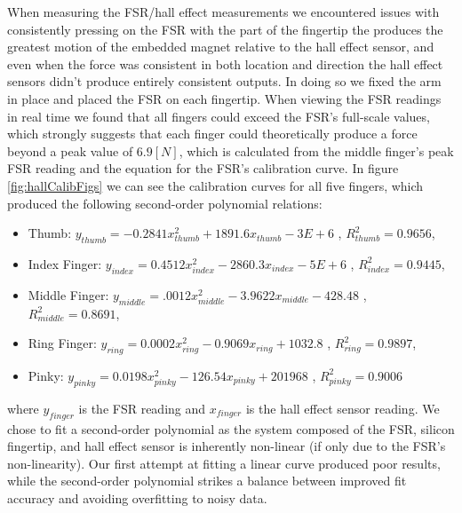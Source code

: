 \documentclass[10pt]{article}
\begin{document}
When measuring the FSR/hall effect measurements we encountered issues with consistently pressing on the FSR with the part of the fingertip the produces the greatest motion of the embedded magnet relative to the hall effect sensor, and even when the force was consistent in both location and direction the hall effect sensors didn't produce entirely consistent outputs. In doing so we fixed the arm in place and placed the FSR on each fingertip. When viewing the FSR readings in real time we found that all fingers could exceed the FSR's full-scale values, which strongly suggests that each finger could theoretically produce a force beyond a peak value of $6.9[N]$, which is calculated from the middle finger's peak FSR reading and the equation for the FSR's calibration curve. In figure \ref{fig:hallCalibFigs} we can see the calibration curves for all five fingers, which produced the following second-order polynomial relations:
\begin{itemize}
    \item Thumb: $y_{thumb}=-0.2841x_{thumb}^2 +1891.6x_{thumb} - 3E+6$ , $R^2_{thumb}=0.9656$,
    \item Index Finger: $y_{index}=0.4512x_{index}^2 -2860.3x_{index}-5E+6$ ,  $R^2_{index}=0.9445$,
    \item Middle Finger: $y_{middle}=.0012x_{middle}^2 - 3.9622x_{middle} - 428.48$ ,  $R^2_{middle}=0.8691$,
    \item Ring Finger: $y_{ring}=0.0002x_{ring}^2 - 0.9069x_{ring} + 1032.8$ ,  $R^2_{ring}=0.9897$,
    \item Pinky: $y_{pinky}=0.0198x_{pinky}^2 - 126.54x_{pinky} + 201968$ ,  $R^2_{pinky}=0.9006$
\end{itemize}
where $y_{finger}$ is the FSR reading and $x_{finger}$ is the hall effect sensor reading. We chose to fit a second-order polynomial as the system composed of the FSR, silicon fingertip, and hall effect sensor is inherently non-linear (if only due to the FSR's non-linearity). Our first attempt at fitting a linear curve produced poor results, while the second-order polynomial strikes a balance between improved fit accuracy and avoiding overfitting to noisy data.
\end{document}
